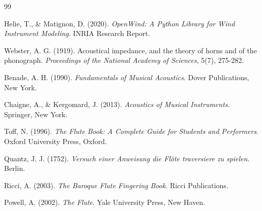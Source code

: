 \documentclass[12pt,a4paper,twocolumn]{article}
\begin{document}
\begin{thebibliography}{99}

Helie, T., \& Matignon, D. (2020).
\textit{OpenWind: A Python Library for Wind Instrument Modeling}.
INRIA Research Report.

Webster, A. G. (1919).
Acoustical impedance, and the theory of horns and of the phonograph.
\textit{Proceedings of the National Academy of Sciences}, 5(7), 275-282.

Benade, A. H. (1990).
\textit{Fundamentals of Musical Acoustics}.
Dover Publications, New York.

Chaigne, A., \& Kergomard, J. (2013).
\textit{Acoustics of Musical Instruments}.
Springer, New York.

Toff, N. (1996).
\textit{The Flute Book: A Complete Guide for Students and Performers}.
Oxford University Press, Oxford.

Quantz, J. J. (1752).
\textit{Versuch einer Anweisung die Flöte traversiere zu spielen}.
Berlin.

Ricci, A. (2003).
\textit{The Baroque Flute Fingering Book}.
Ricci Publications.

Powell, A. (2002).
\textit{The Flute}.
Yale University Press, New Haven.

\end{thebibliography}
\end{document}
